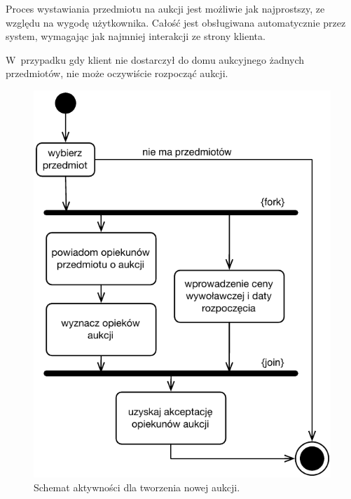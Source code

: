 \documentclass[10pt,a4paper]{article}
\begin{document}
Proces wystawiania przedmiotu na aukcji jest możliwie jak najprostszy, ze
względu na wygodę użytkownika. Całość jest obsługiwana automatycznie przez
system, wymagając jak najmniej interakcji ze strony klienta.

W~przypadku gdy klient nie dostarczył do domu aukcyjnego żadnych przedmiotów,
nie może oczywiście rozpocząć aukcji.

\vspace{40pt}
\begin{figure}[hb]
  \begin{adjustwidth}{-3cm}{-3cm}
    \centering
    \includegraphics{figury/aktywnosc-nowa-aukcja}
    \caption{Schemat aktywności dla tworzenia nowej aukcji.}
    \label{fig:aktywnosc_nowa_aukcja}
  \end{adjustwidth}
\end{figure}
\clearpage
\end{document}
